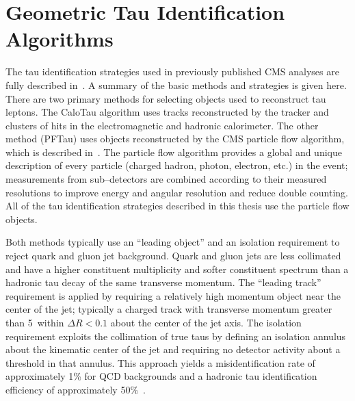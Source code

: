 \section{Geometric Tau Identification Algorithms}
\label{sec:GeometricTauId}
%
The tau identification strategies used in previously published CMS analyses are
fully described in~\cite{CMS-PAS-PFT-08-001}.  A summary of the basic methods
and strategies is given here. There are two primary methods for selecting
objects used to reconstruct tau leptons.  The CaloTau algorithm uses tracks
reconstructed by the tracker and clusters of hits in the electromagnetic and
hadronic calorimeter.  The other method (PFTau) uses objects reconstructed by
the CMS particle flow algorithm, which is described
in~\cite{CMS-PAS-PFT-09-001}.  The particle flow algorithm provides a global and
unique description of every particle (charged hadron, photon, electron, etc.) in
the event; measurements from sub--detectors are combined according to their
measured resolutions to improve energy and angular resolution and reduce double
counting.  All of the tau identification strategies described in this thesis use
the particle flow objects.

Both methods typically use an ``leading object'' and an isolation requirement to
reject quark and gluon jet background.  Quark and gluon jets are less collimated
and have a higher constituent multiplicity and softer constituent \pt spectrum
than a hadronic tau decay of the same transverse momentum.  The ``leading
track'' requirement is applied by requiring a relatively high momentum object
near the center of the jet; typically a charged track with transverse momentum
greater than 5~\GeVc within $\Delta R < 0.1$ about the center of the jet axis.
The isolation requirement exploits the collimation of true taus by defining an
isolation annulus about the kinematic center of the jet and requiring no
detector activity about a threshold in that annulus.  This approach yields a
misidentification rate of approximately 1\% for QCD backgrounds and a hadronic
tau identification efficiency of approximately 50\%~\cite{CMS-PAS-PFT-08-001}.

